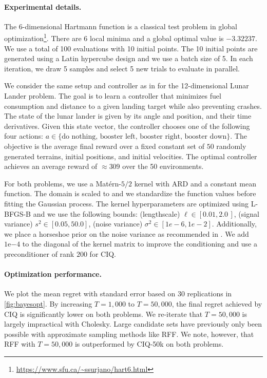 \paragraph{Experimental details.}
The 6-dimensional Hartmann function is a classical test problem in global optimization\footnote{\url{https://www.sfu.ca/~ssurjano/hart6.html}}.
There are 6 local minima and a global optimal value is $-3.32237$.
We use a total of 100 evaluations with 10 initial points.
The 10 initial points are generated using a Latin hypercube design and we use a batch size of 5.
In each iteration, we draw 5 samples and select 5 new trials to evaluate in parallel.

We consider the same setup and controller as in \cite{eriksson2019scalable} for the 12-dimensional Lunar Lander problem.
The goal is to learn a controller that minimizes fuel consumption and distance to a given landing target while also preventing crashes.
The state of the lunar lander is given by its angle and position, and their time derivatives.
Given this state vector, the controller chooses one of the following four actions: $a \in \{\text{do nothing, booster left, booster right, booster down}\}$.
The objective is the average final reward over a fixed constant set of $50$ randomly generated terrains, initial positions, and initial velocities.
The optimal controller achieves an average reward of $\approx 309$ over the 50 environments.

For both problems, we use a Mat\'ern-$5/2$ kernel with ARD and a constant mean function.
The domain is scaled to  and we standardize the function values before fitting the Gaussian process.
The kernel hyperparameters are optimized using L-BFGS-B and we use the following bounds: (lengthscale) $\ell \in [0.01, 2.0\,]$, (signal variance) $s^2 \in [0.05, 50.0]$, (noise variance) $\sigma^2 \in [1e-6, 1e-2]$.
Additionally, we place a horseshoe prior on the noise variance as recommended in \cite{snoek2012practical}.
We add $1\mathrm{e}{-4}$ to the diagonal of the kernel matrix to improve the conditioning and use a preconditioner of rank $200$ for CIQ.

\paragraph{Optimization performance.}
We plot the mean regret with standard error based on 30 replications in \cref{fig:bayesopt}.
By increasing $T=1,\!000$ to $T=50,\!000$, the final regret achieved by CIQ is significantly lower on both problems.
We re-iterate that $T=50,\!000$ is largely impractical with Cholesky.
Large candidate sets have previously only been possible with approximate sampling methods like RFF.
We note, however, that RFF with $T=50,\!000$ is outperformed by CIQ-50k on both problems.

